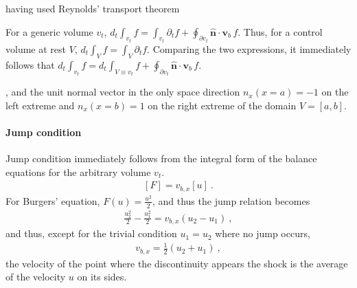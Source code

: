 \documentclass[letterpaper,10pt,english]{jupyterBook}
\begin{document}
\sphinxAtStartPar
having used Reynolds’ transport theorem%
\begin{footnote}[1]\sphinxAtStartFootnote
For a generic volume \(v_t\), \(d_t \int_{v_t} f = \int_{v_t} \partial_t f + \oint_{\partial v_t} \hat{\mathbf{n}} \cdot \mathbf{v}_b \, f\). Thus, for a control volume at rest \(V\), \(d_t \int_V f = \int_V \partial_t f\). Comparing the two expressions, it immediately follows that \(d_t \int_{v_t} f = d_t \int_{V \equiv v_t} f + \oint_{\partial v_t} \hat{\mathbf{n}} \cdot \mathbf{v}_b \, f\).
%
\end{footnote}, and the unit normal vector in the only space direction \(n_x(x=a) = -1\) on the left extreme and \(n_x(x=b) = 1\) on the right extreme of the domain \(V = [a,b]\).


\paragraph{Jump condition}
\label{\detokenize{ch/pde/hyperbolic-1d-scalar-nonlinear:jump-condition}}\label{\detokenize{ch/pde/hyperbolic-1d-scalar-nonlinear:pde-hyperbolic-problems-scalar-nonlinear-examples-burgers-jump}}
\sphinxAtStartPar
Jump condition immediately follows from the integral form of the balance equations for the arbitrary volume \(v_t\).
\begin{equation*}
\begin{split}[ F ] = v_{b,x} [ u ] \ .\end{split}
\end{equation*}
\sphinxAtStartPar
For Burgers’ equation, \(F(u) = \frac{u^2}{2}\), and thus the jump relation becomes
\begin{equation*}
\begin{split}
  \frac{u^2_2}{2} - \frac{u^2_1}{2} = v_{b,x} \left( u_2 - u_1 \right) \ ,
\end{split}
\end{equation*}
\sphinxAtStartPar
and thus, except for the trivial condition \(u_1 = u_2\) where no jump occurs,
\begin{equation*}
\begin{split}v_{b,x} = \frac{1}{2} \left( u_2 + u_1 \right) \ ,\end{split}
\end{equation*}
\sphinxAtStartPar
the velocity of the point where the discontinuity appears \sphinxhyphen{} the shock \sphinxhyphen{} is the average of the velocity \(u\) on its sides.

\sphinxAtStartPar
{} 
\end{document}
